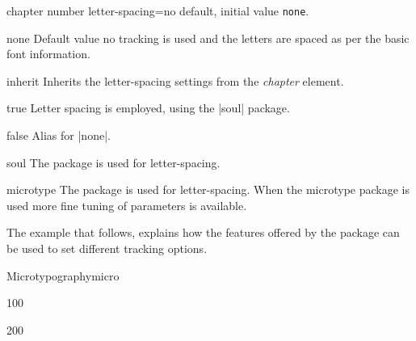 \begin{decription}
%

\begin{docKey}[phd]{chapter number letter-spacing}{=}{no default, initial value \texttt{none}}.
\end{docKey}

\begin{marglist}
\item[none] Default value no tracking is used and the letters are spaced as per the basic font information.
\item[inherit] Inherits the letter-spacing settings from the \emph{chapter} element.
\item[true] Letter spacing is employed, using the |soul| package.
\item[false] Alias for |none|.
\item[soul] The  package is used for letter-spacing.
\item[microtype] The  package is used for letter-spacing. When the microtype package is used more fine tuning of parameters is available.
\end{marglist}

The example that follows, explains how the features offered by the  package can be used to
set different tracking options.

\begin{texexample}{Microtypography}{micro}
\bgroup

 { 100 }

{\huge {}}

 { 200 }
 
{\huge {}}


\end{texexample}
\end{decription}
